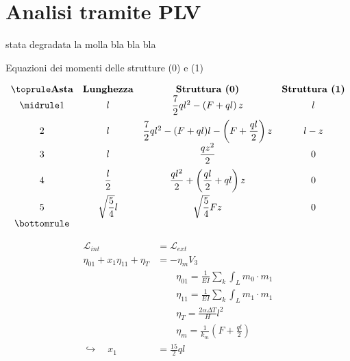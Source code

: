 \section{Analisi tramite PLV}
\e stata degradata la molla bla bla bla

\begin{table}[H]
\caption{Equazioni dei momenti delle strutture (0) e (1)}
\[
\begin{array}{cccc}
	\toprule
	\textbf{Asta}&\textbf{Lunghezza} & \textbf{Struttura (0)} & \textbf{Struttura (1)}\\
	\midrule
	1&l&\dfrac{7}{2}ql^2-\left(F+ql\right)z&l\\[2ex]
	2&l&\dfrac{7}{2}ql^2-(F+ql)l-\left(F+\dfrac{ql}{2}\right)z &l-z\\
	3&l&\dfrac{qz^2}{2}&0\\[2ex]
	4&\dfrac{l}{2}&\dfrac{ql^2}{2}+\left(\dfrac{ql}{2} + ql\right)z&0\\[2ex]
	5&\sqrt{\dfrac{5}{4}}l&\sqrt{\dfrac{5}{4}}Fz&0\\
	\bottomrule
\end{array}
\]
\end{table}

\begin{align*}
	\mathscr{L}_{int} &= \mathscr{L}_{ext}	\\
	\eta_{01}+x_1 \eta_{11} + \eta_T &= - \eta_m V_3 \\
	& \qquad \eta_{01}= \frac{1}{EI}\sum_{k}\int_L m_0 \cdot m_1\\
	& \qquad \eta_{11}= \frac{1}{EI}\sum_{k}\int_L m_1 \cdot m_1\\
	& \qquad \eta_T = \frac{2 \alpha \Delta T}{H}l^2 \\
	& \qquad \eta_m = \frac{1}{k_m} \left( F+\frac{ql}{2}\right)\\
	 \hookrightarrow \quad  x_1 &= \frac{15}{2}ql
\end{align*}
